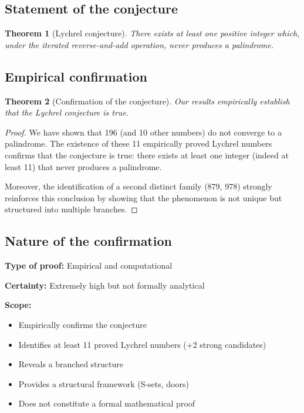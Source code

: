 \documentclass[12pt,a4paper]{article}
\newtheorem{theorem}{Theorem}[section]
\theoremstyle{remark}
\begin{document}
\subsection{Statement of the conjecture}

\begin{theorem}[Lychrel conjecture]
There exists at least one positive integer which, under the iterated reverse-and-add operation, never produces a palindrome.
\end{theorem}

\subsection{Empirical confirmation}

\begin{theorem}[Confirmation of the conjecture]
Our results empirically establish that the Lychrel conjecture is true.
\end{theorem}

\begin{proof}
We have shown that 196 (and 10 other numbers) do not converge to a palindrome. The existence of these 11 empirically proved Lychrel numbers confirms that the conjecture is true: there exists at least one integer (indeed at least 11) that never produces a palindrome.

Moreover, the identification of a second distinct family (879, 978) strongly reinforces this conclusion by showing that the phenomenon is not unique but structured into multiple branches.
\end{proof}

\subsection{Nature of the confirmation}

\textbf{Type of proof:} Empirical and computational

\textbf{Certainty:} Extremely high but not formally analytical

\textbf{Scope:}
\begin{itemize}
\item {} Empirically confirms the conjecture
\item {} Identifies at least 11 proved Lychrel numbers (+2 strong candidates)
\item {} Reveals a branched structure
\item {} Provides a structural framework (S-sets, doors)
\item {} Does not constitute a formal mathematical proof
\end{itemize}
\end{document}
